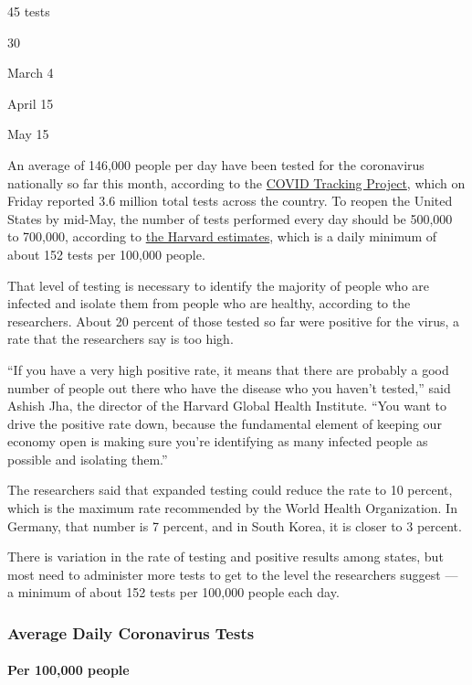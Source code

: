 45 tests

30

March 4

April 15

May 15

An average of 146,000 people per day have been tested for the
coronavirus nationally so far this month, according to the
\href{https://covidtracking.com/}{COVID Tracking Project}, which on
Friday reported 3.6 million total tests across the country. To reopen
the United States by mid-May, the number of tests performed every day
should be 500,000 to 700,000, according to
\href{https://globalepidemics.org/2020/04/18/why-we-need-500000-tests-per-day-to-open-the-economy-and-stay-open/}{the
Harvard estimates}, which is a daily minimum of about 152 tests per
100,000 people.

That level of testing is necessary to identify the majority of people
who are infected and isolate them from people who are healthy, according
to the researchers. About 20 percent of those tested so far were
positive for the virus, a rate that the researchers say is too high.

``If you have a very high positive rate, it means that there are
probably a good number of people out there who have the disease who you
haven't tested,'' said Ashish Jha, the director of the Harvard Global
Health Institute. ``You want to drive the positive rate down, because
the fundamental element of keeping our economy open is making sure
you're identifying as many infected people as possible and isolating
them.''

The researchers said that expanded testing could reduce the rate to 10
percent, which is the maximum rate recommended by the World Health
Organization. In Germany, that number is 7 percent, and in South Korea,
it is closer to 3 percent.

There is variation in the rate of testing and positive results among
states, but most need to administer more tests to get to the level the
researchers suggest --- a minimum of about 152 tests per 100,000 people
each day.

\hypertarget{average-daily-coronavirus-tests}{%
\subsubsection{Average Daily Coronavirus
Tests}\label{average-daily-coronavirus-tests}}

\hypertarget{per-100000-people}{%
\paragraph{Per 100,000 people}\label{per-100000-people}}

